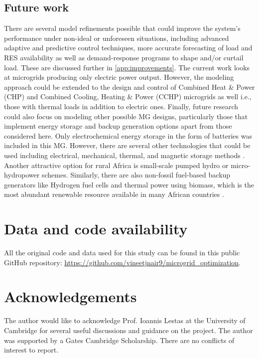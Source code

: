 \documentclass[final,3p,times]{elsarticle}
\begin{document}
\subsection{Future work \label{sec:future}}

There are several model refinements possible that could improve the system's performance under non-ideal or unforeseen situations, including advanced adaptive and predictive control techniques, more accurate forecasting of load and RES availability as well as demand-response programs to shape and/or curtail load. These are discussed further in \cref{app:improvements}. The current work looks at microgrids producing only electric power output. However, the modeling approach could be extended to the design and control of Combined Heat \& Power (CHP) and Combined Cooling, Heating \& Power (CCHP) microgrids as well i.e., those with thermal loads in addition to electric ones. Finally, future research could also focus on modeling other possible MG designs, particularly those that implement energy storage and backup generation options apart from those considered here. Only electrochemical energy storage in the form of batteries was included in this MG. However, there are several other technologies that could be used including electrical, mechanical, thermal, and magnetic storage methods \cite{ESS_control}. Another attractive option for rural Africa is small-scale pumped hydro or micro-hydropower schemes. Similarly, there are also non-fossil fuel-based backup generators like Hydrogen fuel cells and thermal power using biomass, which is the most abundant renewable resource available in many African countries \cite{usea}.

\section{Data and code availability}

All the original code and data used for this study can be found in this public GitHub repository: \url{https://github.com/vineetjnair9/microgrid_optimization}.

\section{Acknowledgements}
The author would like to acknowledge Prof. Ioannis Lestas at the University of Cambridge for several useful discussions and guidance on the project. The author was supported by a Gates Cambridge Scholarship. There are no conflicts of interest to report.
\end{document}
